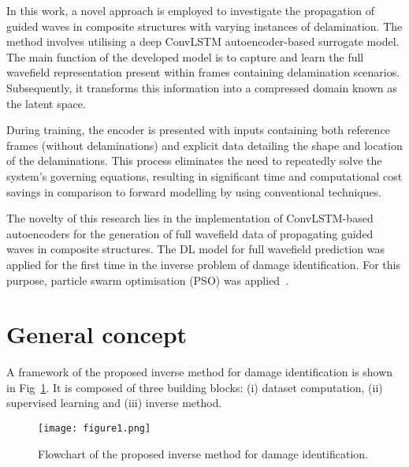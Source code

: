 In this work, a novel approach is employed to investigate the propagation of guided waves in composite structures with varying instances of delamination. 
The method involves utilising a deep ConvLSTM autoencoder-based surrogate model. 
The main function of the developed model is to capture and learn the full wavefield representation present within frames containing delamination scenarios. 
Subsequently, it transforms this information into a compressed domain known as the latent space.

During training, the encoder is presented with inputs containing both reference frames (without delaminations) and explicit data detailing the shape and location of the delaminations. 
This process eliminates the need to repeatedly solve the system's governing equations, resulting in significant time and computational cost savings in comparison to forward modelling by using conventional techniques.

The novelty of this research lies in the implementation of ConvLSTM-based autoencoders for the generation of full wavefield data of propagating guided waves in composite structures.
The DL model for full wavefield prediction was applied for the first time in the inverse problem of damage identification.
For this purpose, particle swarm optimisation (PSO) was applied~\cite{Keneddy1995}.
\section{General concept}
A framework of the proposed inverse method for damage identification is shown in Fig~\ref{fig:complete_flowchart}.
It is composed of three building blocks: (i) dataset computation, (ii) supervised learning and (iii) inverse method.

\begin{figure} [h!]
	\begin{center}
		\texttt{[image: figure1.png]}
	\end{center}
	\caption{Flowchart of the proposed inverse method for damage identification.} 
	\label{fig:complete_flowchart}
\end{figure}

